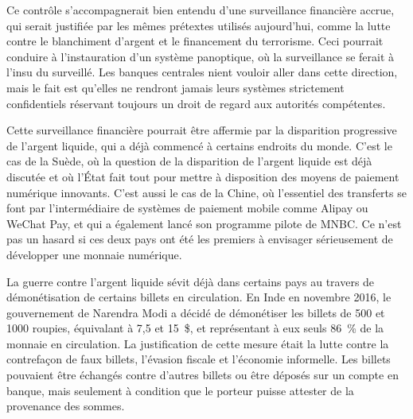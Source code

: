 Ce contrôle s'accompagnerait bien entendu d'une surveillance financière accrue, qui serait justifiée par les mêmes prétextes utilisés aujourd'hui, comme la lutte contre le blanchiment d'argent et le financement du terrorisme. Ceci pourrait conduire à l'instauration d'un système panoptique, où la surveillance se ferait à l'insu du surveillé. Les banques centrales nient vouloir aller dans cette direction, mais le fait est qu'elles ne rendront jamais leurs systèmes strictement confidentiels réservant toujours un droit de regard aux autorités compétentes.

Cette surveillance financière pourrait être affermie par la disparition progressive de l'argent liquide, qui a déjà commencé à certains endroits du monde. C'est le cas de la Suède, où la question de la disparition de l'argent liquide est déjà discutée et où l'État fait tout pour mettre à disposition des moyens de paiement numérique innovants. C'est aussi le cas de la Chine, où l'essentiel des transferts se font par l'intermédiaire de systèmes de paiement mobile comme Alipay ou WeChat Pay, et qui a également lancé son programme pilote de MNBC. Ce n'est pas un hasard si ces deux pays ont été les premiers à envisager sérieusement de développer une monnaie numérique.

La guerre contre l'argent liquide sévit déjà dans certains pays au travers de démonétisation de certains billets en circulation. En Inde en novembre 2016, le gouvernement de Narendra Modi a décidé de démonétiser les billets de 500 et 1000 roupies, équivalant à 7,5 et 15~\$, et représentant à eux seuls 86~\% de la monnaie en circulation. La justification de cette mesure était la lutte contre la contrefaçon de faux billets, l'évasion fiscale et l'économie informelle. Les billets pouvaient être échangés contre d'autres billets ou être déposés sur un compte en banque, mais seulement à condition que le porteur puisse attester de la provenance des sommes.

